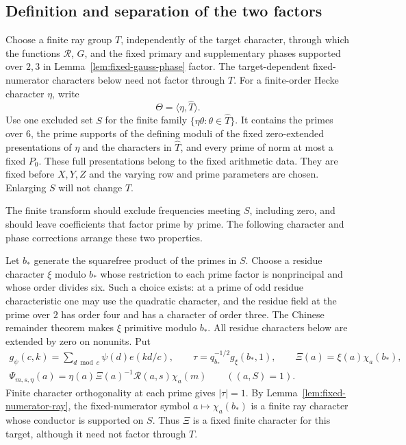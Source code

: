 \documentclass[11pt,a4paper]{article}
\numberwithin{equation}{section}
\numberwithin{figure}{section}
\theoremstyle{definition}
\theoremstyle{remark}
\begin{document}
\subsection{Definition and separation of the two factors}

Choose a finite ray group $T$, independently of the target character,
through which the functions $\mathcal R$, $G$, and the fixed primary
and supplementary phases supported over $2,3$ in
Lemma~\ref{lem:fixed-gauss-phase} factor.  The target-dependent
fixed-numerator characters below need not factor through $T$.  For a
finite-order Hecke character $\eta$, write
\[
 \Theta=\langle\eta,\widehat T\rangle.
\]
Use one excluded set $S$ for the finite family
$\{\eta\theta:\theta\in\widehat T\}$.  It contains the primes over
$6$, the prime supports of the defining moduli of the fixed
zero-extended presentations of $\eta$ and the characters in
$\widehat T$, and every prime of norm at most a fixed $P_0$.  These
full presentations belong to the fixed arithmetic data.  They are fixed
before $X,Y,Z$ and the varying row and prime parameters are chosen.
Enlarging $S$ will not change $T$.

The finite transform should exclude frequencies meeting $S$, including
zero, and should leave coefficients that factor prime by prime. The
following character and phase corrections arrange these two properties.

Let $b_*$ generate the squarefree product of the primes in $S$.
Choose a residue character $\xi$ modulo $b_*$ whose restriction to
each prime factor is nonprincipal and whose order divides six.  Such
a choice exists: at a prime of odd residue characteristic one may
use the quadratic character, and the residue field at the prime over
$2$ has order four and has a character of order three.  The Chinese
remainder theorem makes $\xi$ primitive modulo $b_*$.  All residue
characters below are extended by zero on nonunits.  Put
\[
 \begin{gathered}
 g_\psi(c,k)=\sum_{d\bmod c}\psi(d)e(kd/c),\qquad
 \tau=q_{b_*}^{-1/2}g_\xi(b_*,1),\qquad
 \Xi(a)=\xi(a)\chi_a(b_*),\\
 \Psi_{m,s,\eta}(a)=
       \eta(a)\Xi(a)^{-1}\mathcal R(a,s)\chi_a(m)
       \qquad ((a,S)=1).
 \end{gathered}
\]
Finite character orthogonality at each prime gives $|\tau|=1$.
By Lemma~\ref{lem:fixed-numerator-ray}, the fixed-numerator symbol
$a\mapsto\chi_a(b_*)$ is a finite ray character whose conductor is
supported on $S$.  Thus $\Xi$ is a fixed finite character for this
target, although it need not factor through $T$.
\end{document}
